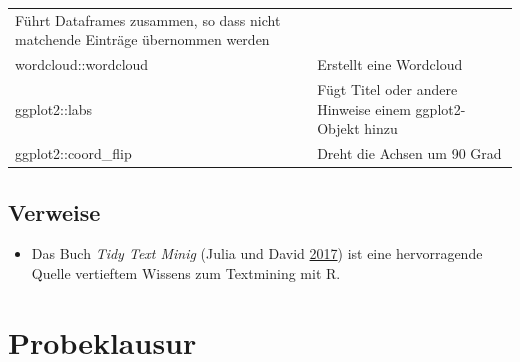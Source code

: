 \documentclass[12pt,ngerman,]{book}
\providecommand{\tightlist}{%
  \setlength{\itemsep}{0pt}\setlength{\parskip}{0pt}}
\theoremstyle{definition}
\theoremstyle{definition}
\theoremstyle{remark}
\begin{document}
\begin{longtable}[]{@{}ll@{}}
\begin{minipage}[t]{0.42\columnwidth}
Führt Dataframes zusammen, so dass nicht matchende Einträge übernommen
werden\strut
\end{minipage}\tabularnewline
\begin{minipage}[t]{0.34\columnwidth}\raggedright\strut
wordcloud::wordcloud\strut
\end{minipage} & \begin{minipage}[t]{0.42\columnwidth}\raggedright\strut
Erstellt eine Wordcloud\strut
\end{minipage}\tabularnewline
\begin{minipage}[t]{0.34\columnwidth}\raggedright\strut
ggplot2::labs\strut
\end{minipage} & \begin{minipage}[t]{0.42\columnwidth}\raggedright\strut
Fügt Titel oder andere Hinweise einem ggplot2-Objekt hinzu\strut
\end{minipage}\tabularnewline
\begin{minipage}[t]{0.34\columnwidth}\raggedright\strut
ggplot2::coord\_flip\strut
\end{minipage} & \begin{minipage}[t]{0.42\columnwidth}\raggedright\strut
Dreht die Achsen um 90 Grad\strut
\end{minipage}\tabularnewline
\bottomrule
\end{longtable}

\section{Verweise}\label{verweise-7}

\begin{itemize}
\tightlist
\item
  Das Buch \emph{Tidy Text Minig} (Julia und David
  \protect\hyperlink{ref-tidytextminig}{2017}) ist eine hervorragende
  Quelle vertieftem Wissens zum Textmining mit R.
\end{itemize}

\appendix

\renewcommand{\section}{\chapter}




\chapter{Probeklausur}\label{probeklausur}
\end{document}
